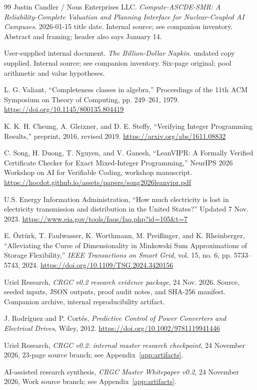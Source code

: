 \documentclass[11pt,letterpaper]{article}
\begin{document}
\begin{thebibliography}{99}
 Justin Candler / Nous Enterprises LLC. \emph{Compute-ASCDE-SMR: A Reliability-Complete Valuation and Planning Interface for Nuclear-Coupled AI Campuses}. 2026-01-15 title date. Internal source; see companion inventory. Abstract and framing; header also says January 14.

 User-supplied internal document. \emph{The Billion-Dollar Napkin}. undated copy supplied. Internal source; see companion inventory. Six-page original; pool arithmetic and value hypotheses.


 L. G. Valiant, ``Completeness classes in algebra,'' Proceedings of the 11th ACM Symposium on Theory of Computing, pp. 249--261, 1979. \url{https://doi.org/10.1145/800135.804419}

 K. K. H. Cheung, A. Gleixner, and D. E. Steffy, ``Verifying Integer Programming Results,'' preprint, 2016, revised 2019. \url{https://arxiv.org/abs/1611.08832}

 C. Song, H. Duong, T. Nguyen, and V. Ganesh, ``LeanVIPR: A Formally Verified Certificate Checker for Exact Mixed-Integer Programming,'' NeurIPS 2026 Workshop on AI for Verifiable Coding, workshop manuscript. \url{https://hocdot.github.io/assets/papers/song2026leanvipr.pdf}

 U.S. Energy Information Administration, ``How much electricity is lost in electricity transmission and distribution in the United States?'' Updated 7 Nov. 2023. \url{https://www.eia.gov/tools/faqs/faq.php?id=105&t=7}

 E. \"Ozt\"urk, T. Faulwasser, K. Worthmann, M. Prei\ss inger, and K. Rheinberger, ``Alleviating the Curse of Dimensionality in Minkowski Sum Approximations of Storage Flexibility,'' \emph{IEEE Transactions on Smart Grid}, vol. 15, no. 6, pp. 5733--5743, 2024. \url{https://doi.org/10.1109/TSG.2024.3420156}

 Uriel Research, \emph{CRGC v0.2 research evidence package}, 24 Nov. 2026. Source, seeded inputs, JSON outputs, proof audit notes, and SHA-256 manifest. Companion archive, internal reproducibility artifact.

 J. Rodr\'iguez and P. Cort\'es, \emph{Predictive Control of Power Converters and Electrical Drives}, Wiley, 2012. \url{https://doi.org/10.1002/9781119941446}

 Uriel Research, \emph{CRGC v0.2: internal master research checkpoint}, 24 November 2026, 23-page source branch; see Appendix~\ref{app:artifacts}.

 AI-assisted research synthesis, \emph{CRGC Master Whitepaper v0.2}, 24 November 2026, Work source branch; see Appendix~\ref{app:artifacts}.

\end{thebibliography}
\end{document}

